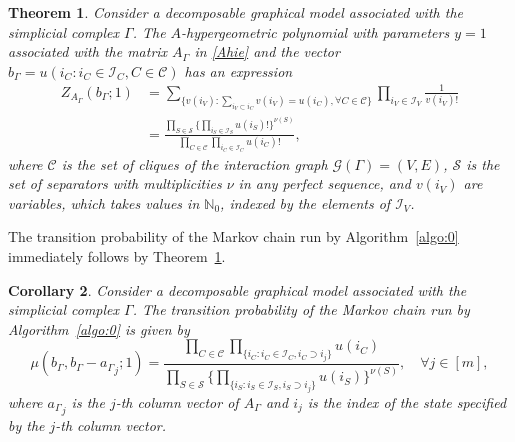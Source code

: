 \documentclass[a4paper,12pt]{article}
\theoremstyle{plain}
\newtheorem{theorem}{Theorem}[section]
\newtheorem{corollary}[theorem]{Corollary}
\theoremstyle{remark}
\begin{document}
\begin{theorem}\label{theo:dec}
  Consider a decomposable graphical model associated with
  the simplicial complex $\Gamma$. The $A$-hypergeometric
  polynomial with parameters $y=1$ associated with the matrix
  $A_\Gamma$ in \eqref{Ahie} and the vector
  $b_\Gamma=u(i_C:i_C\in\mathcal{I}_C,C\in\mathcal{C})$ has
  an expression
  \begin{align}
    Z_{A_\Gamma}(b_\Gamma;1)&=
    \sum_{\{v(i_V):\sum_{i_V{\subset} i_C}v(i_V)
            =u(i_C),\forall C\in\mathcal{C}\}}
    \prod_{i_V\in\mathcal{I}_V}\frac{1}{v(i_V)!}\nonumber\\
    &=\frac{\prod_{S\in\mathcal{S}}
    \{\prod_{i_S\in\mathcal{I}_S}u(i_S)!\}^{\nu(S)}}
    {\prod_{C\in\mathcal{C}}\prod_{i_C\in\mathcal{I}_C}u(i_C)!},
    \label{GHTdec}
  \end{align}
  where $\mathcal{C}$ is the set of cliques of the interaction
  graph $\mathcal{G}(\Gamma)=(V,E)$, $\mathcal{S}$ is the set
  of separators with multiplicities $\nu$ in any perfect
  sequence, and $v(i_V)$ are variables, which takes values in
  $\mathbb{N}_0$, indexed by the elements of $\mathcal{I}_V$.
\end{theorem}

The transition probability of the Markov chain run by
Algorithm~\ref{algo:0} immediately follows by Theorem~\ref{theo:dec}.

\begin{corollary}
  Consider a decomposable graphical model associated with
  the simplicial complex $\Gamma$. The transition probability of
  the Markov chain run by Algorithm~\ref{algo:0} is given by
  \begin{equation}
    \mu(b_\Gamma,b_\Gamma-{a_{\Gamma}}_j;1)
    =\frac{\prod_{C\in\mathcal{C}}
    \prod_{\{i_C:i_C\in\mathcal{I}_C,i_C{\supset} i_j\}}u(i_C)}
    {\prod_{S\in\mathcal{S}}
    \{\prod_{\{i_S:i_S\in\mathcal{I}_S,i_S{\supset} i_j\}}
           {u(i_S)}\}^{\nu(S)}}, \quad \forall j\in[m],
    \label{trans}
  \end{equation}
  where ${a_{\Gamma}}_j$ is the $j$-th column vector of
  $A_\Gamma$ and $i_j$ is the index of the state specified
  by the $j$-th column vector.
\end{corollary}
\end{document}
